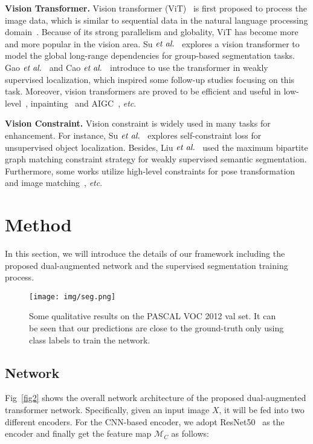 \documentclass[journal]{IEEEtran}
\newcommand{\etc}{\textit{etc}}
\begin{document}
\vspace{1ex}

\textbf{Vision Transformer.} 
Vision transformer (ViT)~\cite{dosovitskiy2020image} is first proposed to process the image data, which is similar to sequential data in the natural language processing domain~\cite{vaswani2017attention}. Because of its strong parallelism and globality, ViT has become more and more popular in the vision area.
Su $\emph{et~al.}$~\cite{su2023unified} explores a vision transformer to model the global long-range dependencies for group-based segmentation tasks.
Gao $\emph{et~al.}$~\cite{gao2021ts} and Cao $\emph{et~al.}$~\cite{cao2023semantic} introduce to use the transformer in weakly supervised localization, which inspired some follow-up studies focusing on this task. Moreover, vision transformers are proved to be efficient and useful in low-level~\cite{liang2021swinir}, inpainting~\cite{liu2021fuseformer} and AIGC~\cite{rombach2022high}, \etc.


\vspace{1ex}

\textbf{Vision Constraint.} 
Vision constraint is widely used in many tasks for enhancement. For instance, Su $\emph{et~al.}$~\cite{su2022self} explores self-constraint loss for unsupervised object localization. Besides, Liu $\emph{et~al.}$~\cite{liu2020weakly} used the maximum bipartite graph matching constraint strategy for weakly supervised semantic segmentation. Furthermore, some works utilize high-level constraints for pose transformation~\cite{su2022general} and image matching~\cite{sarlin2020superglue}, \etc.


\section{Method}
In this section, we will introduce the details of our framework including the proposed dual-augmented network and the supervised segmentation training process.

\begin{figure*}[t]
		\begin{center}
			\centering
			\texttt{[image: img/seg.png]}
		\end{center}
		\caption{Some qualitative results on the PASCAL VOC 2012 val set. It can be seen that our predictions are close to the ground-truth only using class labels to train the network.}
		\label{fig3}
\end{figure*}

\subsection{Network}
Fig~\ref{fig2} shows the overall network architecture of the proposed dual-augmented transformer network. Specifically, given an input image $X$, it will be fed into two different encoders. For the CNN-based encoder, we adopt ResNet50~\cite{he2016deep} as the encoder and finally get the feature map $\mathcal{M}_C$ as follows:
\end{document}
